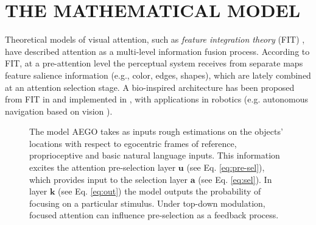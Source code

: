\documentclass[letterpaper, 10 pt, conference]{ieeeconf}  %
\begin{document}
	
	\section{THE MATHEMATICAL MODEL}	
	\label{sec:model}
	
	Theoretical models of visual attention, such as \textit{feature integration theory} (FIT) \cite{treisman1980}, have described attention as a multi-level information fusion process. According to FIT, at a pre-attention level the perceptual system receives from separate maps feature salience information (e.g., color, edges, shapes), which are lately combined at an attention selection stage. A bio-inspired architecture has been proposed from FIT in \cite{koch1985} and implemented in \cite{itti1998}, with applications in robotics (e.g. autonomous navigation based on vision \cite{siagian2014}).

	\begin{figure}[h!]
		\caption{The model AEGO takes as inputs rough estimations on the objects' locations with respect to egocentric frames of reference, proprioceptive and basic natural language inputs. This information excites the attention pre-selection layer $\mathbf{u}$ (see Eq. \eqref{eq:pre-sel}), which provides input to the selection layer $\mathbf{a}$ (see Eq. \eqref{eq:sel}). In layer $\mathbf{k}$ (see Eq. \eqref{eq:out}) the model outputs the probability of focusing on a particular stimulus. Under top-down modulation, focused attention can influence pre-selection as a feedback process.}
		\label{fig:AEGO}
	\end{figure}
\end{document}
